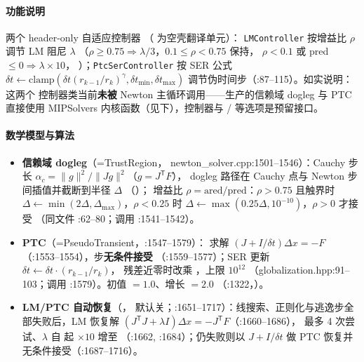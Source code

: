 \paragraph{功能说明} 两个 header-only 自适应控制器
（ 为空壳翻译单元）：
\texttt{LMController} 按增益比 $\rho$ 调节 LM 阻尼 $\lambda$
（$\rho\ge0.75\Rightarrow\lambda/3$，$0.1\le\rho<0.75$ 保持，
$\rho<0.1$ 或 pred$\le0\Rightarrow\lambda\times10$，
）；\texttt{PtcSerController} 按 SER 公式
$\delta t\leftarrow\mathrm{clamp}(\delta t(r_{k-1}/r_k)^\gamma,
\delta t_{\min},\delta t_{\max})$ 调节伪时间步（:87--115）。如实说明：这两个
控制器类当前\textbf{未被} Newton 主循环调用——生产的信赖域 dogleg 与 PTC
直接使用 MIPSolvers 内核函数（见下），控制器与 /
 等选项是预留接口。
\paragraph{数学模型与算法}
\begin{itemize}
  \item \textbf{信赖域 dogleg}（=TrustRegion，
        newton\_solver.cpp:1501--1546）：Cauchy 步长
        $\alpha_c=\lVert g\rVert^2/\lVert Jg\rVert^2$（$g=J^{\mathsf T}F$），
        dogleg 路径在 Cauchy 点与 Newton 步间插值并截断到半径 $\Delta$
        （）；
        增益比 $\rho=\mathrm{ared}/\mathrm{pred}$：$\rho>0.75$ 且触界时
        $\Delta\leftarrow\min(2\Delta,\Delta_{\max})$，$\rho<0.25$ 时
        $\Delta\leftarrow\max(0.25\Delta,10^{-10})$，$\rho>0$ 才接受
        （同文件 :62--80；调用 :1541--1542）。
  \item \textbf{PTC}（=PseudoTransient，:1547--1579）：
        求解 $(J+I/\delta t)\Delta x=-F$（:1553--1554），步\textbf{无条件接受}
        （:1559--1577）；SER 更新 $\delta t\leftarrow\delta t\cdot(r_{k-1}/r_k)$，
        残差近零时改乘 ，上限 $10^{12}$
        （globalization.hpp:91--103；调用 :1579）。初值
        $=1.0$、增长 $=2.0$
        （:1322，）。
  \item \textbf{LM/PTC 自动恢复}（，
        默认关；:1651--1717）：线搜索、正则化与逃逸步全部失败后，LM 恢复解
        $(J^{\mathsf T}J+\lambda I)\Delta x=-J^{\mathsf T}F$（:1660--1686），
        最多 4 次尝试、$\lambda$ 自  起 $\times10$ 增至
        （:1662, :1684）；仍失败则以 $J+I/\delta t$ 做
        PTC 恢复并无条件接受（:1687--1716）。
\end{itemize}

